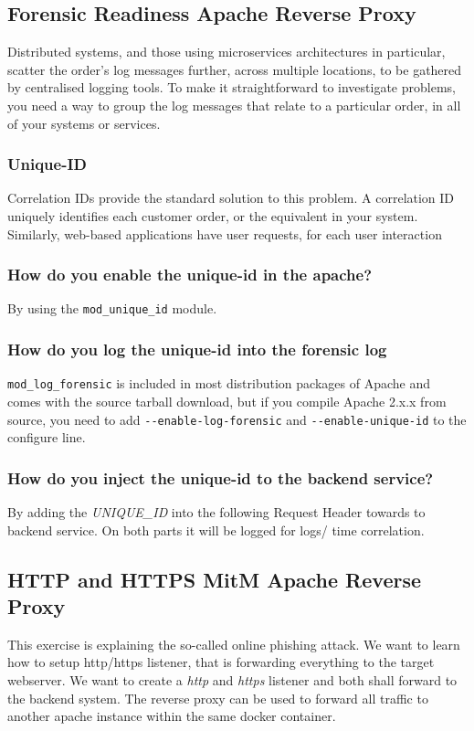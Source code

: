 \subsection{Forensic Readiness Apache Reverse Proxy}
Distributed systems, and those using microservices architectures in particular, scatter the order's log messages further, across multiple locations, to be gathered by centralised logging tools. To make it straightforward to investigate problems, you need a way to group the log messages that relate to a particular order, in all of your systems or services.

\subsubsection{Unique-ID}
Correlation IDs provide the standard solution to this problem. A correlation ID uniquely identifies each \glqq customer order\grqq, or the equivalent in your system. Similarly, web-based applications have \glqq user requests\grqq, for each user interaction

\subsubsection{How do you enable the unique-id in the apache?}
By using the \lstinline|mod_unique_id| module.

\subsubsection{How do you log the unique-id into the forensic log}
\lstinline|mod_log_forensic| is included in most distribution packages of Apache and comes with the source tarball download, but if you compile Apache 2.x.x from source, you need to add \lstinline|--enable-log-forensic| and \lstinline|--enable-unique-id| to the configure line.

\subsubsection{How do you inject the unique-id to the backend service?}
By adding the \textit{UNIQUE\_ID} into the following Request Header towards to backend service. On both parts it will be logged for logs/ time correlation.

\newpage

\subsection{HTTP and HTTPS MitM Apache Reverse Proxy}
This exercise is explaining the so-called online phishing attack. We want to learn how to setup http/https listener, that is forwarding everything to the target webserver. We want to create a \textit{http} and \textit{https} listener and both shall forward to the backend system.
The reverse proxy can be used to forward all traffic to another apache instance within the same docker container.

